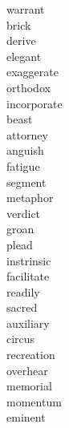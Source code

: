 \documentclass[a4paper, 10pt]{ctexart}
\begin{document}
\begin{multicols*}{2}
\begin{description}
\item[warrant]

\item[brick]

\item[derive]

\item[elegant]

\item[exaggerate]

\item[orthodox]

\item[incorporate]

\item[beast]

\item[attorney]

\item[anguish]

\item[fatigue]

\item[segment]

\item[metaphor]

\item[verdict]

\item[groan]

\item[plead]

\item[instrinsic]

\item[facilitate]

\item[readily]

\item[sacred]

\item[auxiliary]

\item[circus]

\item[recreation]

\item[overhear]

\item[memorial]

\item[momentum]

\item[eminent]


\end{description}
\end{multicols*}
\end{document}
